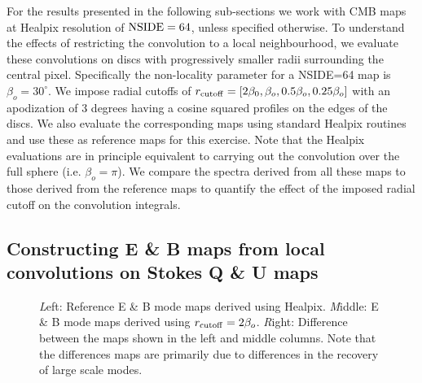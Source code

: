 For the results presented in the following sub-sections we work with CMB maps at Healpix resolution of ${\rm NSIDE}=64$, unless specified otherwise.  To understand the effects of restricting the convolution to a local neighbourhood, we evaluate these convolutions on discs with progressively smaller radii surrounding the central pixel.  Specifically the non-locality parameter for a NSIDE=64 map is $\beta_o=30^{\circ}$. We impose radial cutoffs of $r_{\rm cutoff}=[2\beta_0,\beta_o,0.5\beta_o,0.25\beta_o]$ with an apodization of 3 degrees having a cosine squared profiles on the edges of the discs. We also evaluate the corresponding maps using standard Healpix routines and use these as reference maps for this exercise. Note that the Healpix evaluations are in principle equivalent to carrying out the convolution over the full sphere (i.e. $\beta_o=\pi$).  We compare the spectra derived from all these maps to those derived from the reference maps to quantify the effect of the imposed radial cutoff on the convolution integrals.

\subsection{Constructing E \& B maps from local convolutions on Stokes Q \& U maps}

%
\begin{figure}[!h] 
\centering
{}
\caption{{\textit Left:} Reference E \& B mode maps derived using Healpix. {\textit Middle:} E \& B mode maps derived using $r_{\rm cutoff}=2\beta_o$. {\textit Right:} Difference between the maps shown in the left and middle columns. Note that the differences maps are primarily due to differences in the recovery of large scale modes.}
\label{fig:eb-maps-compare}
\end{figure}
%
%
\begin{figure}[!h] 
\centering
{}
\caption{}
\label{fig:eq-spectra_rad_cutoff}
\end{figure}
%
